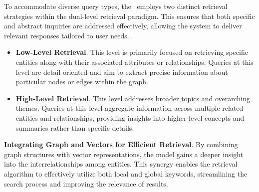 To accommodate diverse query types, the \model\ employs two distinct retrieval strategies within the dual-level retrieval paradigm. This ensures that both specific and abstract inquiries are addressed effectively, allowing the system to deliver relevant responses tailored to user needs.
\begin{itemize}[leftmargin=*]

\item \textbf{Low-Level Retrieval}. This level is primarily focused on retrieving specific entities along with their associated attributes or relationships. Queries at this level are detail-oriented and aim to extract precise information about particular nodes or edges within the graph.

\item \textbf{High-Level Retrieval}. This level addresses broader topics and overarching themes. Queries at this level aggregate information across multiple related entities and relationships, providing insights into higher-level concepts and summaries rather than specific details.

\end{itemize}

\textbf{Integrating Graph and Vectors for Efficient Retrieval}.
By combining graph structures with vector representations, the model gains a deeper insight into the interrelationships among entities. This synergy enables the retrieval algorithm to effectively utilize both local and global keywords, streamlining the search process and improving the relevance of results.\vspace{-0.05in}

